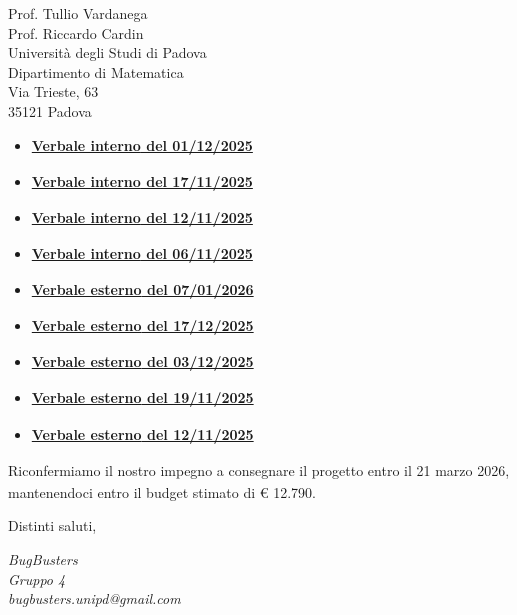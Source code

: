 \documentclass[a4paper,11pt]{letter}
\makeatletter
\newcommand{\GruppoFirma}{BugBusters\\Gruppo 4\\bugbusters.unipd@gmail.com}
\makeatother
\begin{document}
\begin{letter}{Prof. Tullio Vardanega\\Prof. Riccardo Cardin\\Universit\`a degli Studi di Padova\\Dipartimento di Matematica\\Via Trieste, 63\\35121 Padova}
\begin{itemize}
    \item \href{https://bugbustersunipd.github.io/DocumentazioneSWE/RTB/VERBALI/INTERNI/VI_01-12-25/VI_01-12-25.pdf}{\textbf{Verbale interno\textsubscript{} del 01/12/2025}}
    \item \href{https://bugbustersunipd.github.io/DocumentazioneSWE/RTB/VERBALI/INTERNI/VI_17-11-25/VI_17-11-25.pdf}{\textbf{Verbale interno\textsubscript{} del 17/11/2025}}
    \item \href{https://bugbustersunipd.github.io/DocumentazioneSWE/RTB/VERBALI/INTERNI/VI_12-11-25/VI_12-11-25.pdf}{\textbf{Verbale interno\textsubscript{} del 12/11/2025}}
    \item \href{https://bugbustersunipd.github.io/DocumentazioneSWE/RTB/VERBALI/INTERNI/VI_06-11-25/VI_06-11-25.pdf}{\textbf{Verbale interno\textsubscript{} del 06/11/2025}}
    \item \href{https://bugbustersunipd.github.io/DocumentazioneSWE/RTB/VERBALI/ESTERNI/VE_07-01-26/VE_07-01-26.pdf}{\textbf{Verbale esterno\textsubscript{} del 07/01/2026}}
    \item \href{https://bugbustersunipd.github.io/DocumentazioneSWE/RTB/VERBALI/ESTERNI/VE_17-12-25/VE_17-12-25.pdf}{\textbf{Verbale esterno\textsubscript{} del 17/12/2025}}
    \item \href{https://bugbustersunipd.github.io/DocumentazioneSWE/RTB/VERBALI/ESTERNI/VE_03-12-25/VE_03-12-25.pdf}{\textbf{Verbale esterno\textsubscript{} del 03/12/2025}}
    \item \href{https://bugbustersunipd.github.io/DocumentazioneSWE/RTB/VERBALI/ESTERNI/VE_19-11-25/VE_19-11-25.pdf}{\textbf{Verbale esterno\textsubscript{} del 19/11/2025}}
    \item \href{https://bugbustersunipd.github.io/DocumentazioneSWE/RTB/VERBALI/ESTERNI/VE_12-11-25/VE_12-11-25.pdf}{\textbf{Verbale esterno\textsubscript{} del 12/11/2025}}
\end{itemize}

\vspace{0.8em}
Riconfermiamo il nostro impegno a consegnare il progetto\textsubscript{} entro il 21 marzo 2026, mantenendoci entro il budget stimato di € 12.790.

\vspace{1em}
Distinti saluti,

\vspace{1.0em}
\begin{flushleft}
    \textit{\GruppoFirma}
\end{flushleft}

\end{letter}
\end{document}
